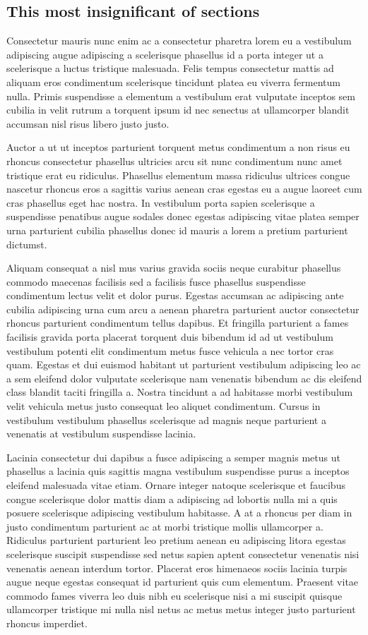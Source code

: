 \subsection{This most insignificant of sections}
Consectetur mauris nunc enim ac a consectetur pharetra lorem eu a vestibulum adipiscing augue adipiscing a scelerisque phasellus id a porta integer ut a scelerisque a luctus tristique malesuada. Felis tempus consectetur mattis ad aliquam eros condimentum scelerisque tincidunt platea eu viverra fermentum nulla. Primis suspendisse a elementum a vestibulum erat vulputate inceptos sem cubilia in velit rutrum a torquent ipsum id nec senectus at ullamcorper blandit accumsan nisl risus libero justo justo.
\par
Auctor a ut ut inceptos parturient torquent metus condimentum a non risus eu rhoncus consectetur phasellus ultricies arcu sit nunc condimentum nunc amet tristique erat eu ridiculus. Phasellus elementum massa ridiculus ultrices congue nascetur rhoncus eros a sagittis varius aenean cras egestas eu a augue laoreet cum cras phasellus eget hac nostra. In vestibulum porta sapien scelerisque a suspendisse penatibus augue sodales donec egestas adipiscing vitae platea semper urna parturient cubilia phasellus donec id mauris a lorem a pretium parturient dictumst.
\par
Aliquam consequat a nisl mus varius gravida sociis neque curabitur phasellus commodo maecenas facilisis sed a facilisis fusce phasellus suspendisse condimentum lectus velit et dolor purus. Egestas accumsan ac adipiscing ante cubilia adipiscing urna cum arcu a aenean pharetra parturient auctor consectetur rhoncus parturient condimentum tellus dapibus. Et fringilla parturient a fames facilisis gravida porta placerat torquent duis bibendum id ad ut vestibulum vestibulum potenti elit condimentum metus fusce vehicula a nec tortor cras quam. Egestas et dui euismod habitant ut parturient vestibulum adipiscing leo ac a sem eleifend dolor vulputate scelerisque nam venenatis bibendum ac dis eleifend class blandit taciti fringilla a. Nostra tincidunt a ad habitasse morbi vestibulum velit vehicula metus justo consequat leo aliquet condimentum. Cursus in vestibulum vestibulum phasellus scelerisque ad magnis neque parturient a venenatis at vestibulum suspendisse lacinia. 
\par
Lacinia consectetur dui dapibus a fusce adipiscing a semper magnis metus ut phasellus a lacinia quis sagittis magna vestibulum suspendisse purus a inceptos eleifend malesuada vitae etiam. Ornare integer natoque scelerisque et faucibus congue scelerisque dolor mattis diam a adipiscing ad lobortis nulla mi a quis posuere scelerisque adipiscing vestibulum habitasse. A at a rhoncus per diam in justo condimentum parturient ac at morbi tristique mollis ullamcorper a. Ridiculus parturient parturient leo pretium aenean eu adipiscing litora egestas scelerisque suscipit suspendisse sed netus sapien aptent consectetur venenatis nisi venenatis aenean interdum tortor. Placerat eros himenaeos sociis lacinia turpis augue neque egestas consequat id parturient quis cum elementum. Praesent vitae commodo fames viverra leo duis nibh eu scelerisque nisi a mi suscipit quisque ullamcorper tristique mi nulla nisl netus ac metus metus integer justo parturient rhoncus imperdiet. 
